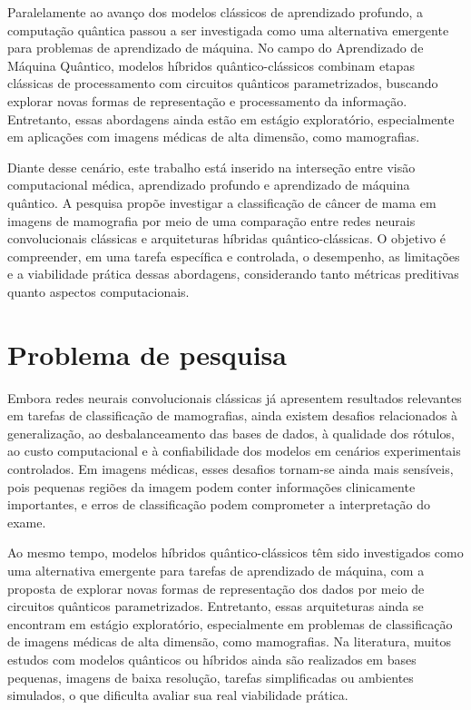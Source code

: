 \documentclass[
    12pt,
    openright,
    oneside,
    a4paper,
    english,
    brazil
]{abntex2}
\begin{document}
Paralelamente ao avanço dos modelos clássicos de aprendizado profundo, a computação quântica passou a ser investigada como uma alternativa emergente para problemas de aprendizado de máquina. No campo do Aprendizado de Máquina Quântico, modelos híbridos quântico-clássicos combinam etapas clássicas de processamento com circuitos quânticos parametrizados, buscando explorar novas formas de representação e processamento da informação. Entretanto, essas abordagens ainda estão em estágio exploratório, especialmente em aplicações com imagens médicas de alta dimensão, como mamografias.

Diante desse cenário, este trabalho está inserido na interseção entre visão computacional médica, aprendizado profundo e aprendizado de máquina quântico. A pesquisa propõe investigar a classificação de câncer de mama em imagens de mamografia por meio de uma comparação entre redes neurais convolucionais clássicas e arquiteturas híbridas quântico-clássicas. O objetivo é compreender, em uma tarefa específica e controlada, o desempenho, as limitações e a viabilidade prática dessas abordagens, considerando tanto métricas preditivas quanto aspectos computacionais.


\section{Problema de pesquisa}

Embora redes neurais convolucionais clássicas já apresentem resultados relevantes em tarefas de classificação de mamografias, ainda existem desafios relacionados à generalização, ao desbalanceamento das bases de dados, à qualidade dos rótulos, ao custo computacional e à confiabilidade dos modelos em cenários experimentais controlados. Em imagens médicas, esses desafios tornam-se ainda mais sensíveis, pois pequenas regiões da imagem podem conter informações clinicamente importantes, e erros de classificação podem comprometer a interpretação do exame.

Ao mesmo tempo, modelos híbridos quântico-clássicos têm sido investigados como uma alternativa emergente para tarefas de aprendizado de máquina, com a proposta de explorar novas formas de representação dos dados por meio de circuitos quânticos parametrizados. Entretanto, essas arquiteturas ainda se encontram em estágio exploratório, especialmente em problemas de classificação de imagens médicas de alta dimensão, como mamografias. Na literatura, muitos estudos com modelos quânticos ou híbridos ainda são realizados em bases pequenas, imagens de baixa resolução, tarefas simplificadas ou ambientes simulados, o que dificulta avaliar sua real viabilidade prática.
\end{document}
